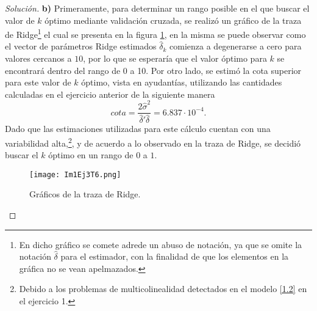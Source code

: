 \documentclass[10.5pt,notitlepage]{article}
\newenvironment{solucion}
  {\begin{proof}[Solución]}
  {\end{proof}}
\theoremstyle{plain}
\begin{document}
\begin{solucion}
\noindent \textbf{b)} Primeramente, para determinar un rango posible en el que buscar el valor de \(\mathit{k}\) óptimo mediante validación cruzada, se realizó un gráfico de la traza de Ridge\footnote{En dicho gráfico se comete adrede un abuso de notación, ya que se omite la notación \(\hat{\delta}\) para el estimador, con la finalidad de que los elementos en la gráfica no se vean apelmazados.} el cual se presenta en la figura \ref{fig:9}, en la misma se puede observar como el vector de parámetros Ridge estimados \(\hat{\delta}_{k}\) comienza a degenerarse a cero para valores cercanos a \(10\), por lo que se esperaría que el valor óptimo para \(\mathit{k}\) se encontrará dentro del rango de 0 a 10. Por otro lado, se estimó la cota superior para este valor de \(k\) óptimo, vista en ayudantías, utilizando las cantidades calculadas en el ejercicio anterior de la siguiente manera 
\begin{equation*}
    cota = \frac{2\hat{\sigma}^2 }{\hat{\delta}'\hat{\delta}} = 6.837\cdot 10^{-4}. 
\end{equation*}
Dado que las estimaciones utilizadas para este cálculo cuentan con una variabilidad alta,\footnote{Debido a los problemas de multicolinealidad detectados en el modelo \eqref{1.2} en el ejercicio 1.}, y de acuerdo a lo observado en la traza de Ridge, se decidió buscar el \(k\) óptimo en un rango de \(0\) a \(1\). \\
\begin{figure}[htb]
 \centering
 \texttt{[image: Im1Ej3T6.png]}
 \caption{Gráficos de la traza de Ridge.}
\label{fig:9}
\end{figure}


\end{solucion}
\end{document}
